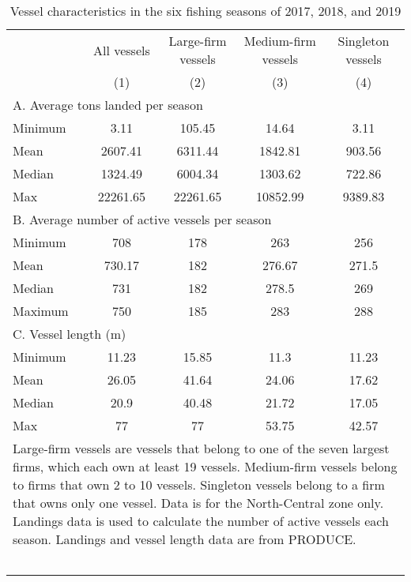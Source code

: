 \begin{table}[tb]
\centering
\caption{Vessel characteristics in the six fishing seasons of 2017, 2018, and 2019} 
\label{vesstats}
\begin{tabular}{lcccc}
   \toprule   & All vessels & Large-firm vessels & Medium-firm vessels & Singleton vessels \\ & (1) & (2) & (3) & (4) \\ 
   \midrule \multicolumn{5}{l}{A. Average tons landed per season} \\ Minimum & 3.11 & 105.45 & 14.64 & 3.11 \\ 
  Mean & 2607.41 & 6311.44 & 1842.81 & 903.56 \\ 
  Median & 1324.49 & 6004.34 & 1303.62 & 722.86 \\ 
  Max & 22261.65 & 22261.65 & 10852.99 & 9389.83 \\ 
   \midrule \multicolumn{5}{l}{B. Average number of active vessels per season} \\ Minimum & 708 & 178 & 263 & 256 \\ 
  Mean & 730.17 & 182 & 276.67 & 271.5 \\ 
  Median & 731 & 182 & 278.5 & 269 \\ 
  Maximum & 750 & 185 & 283 & 288 \\ 
   \midrule \multicolumn{5}{l}{C. Vessel length (m)} \\ Minimum & 11.23 & 15.85 & 11.3 & 11.23 \\ 
  Mean & 26.05 & 41.64 & 24.06 & 17.62 \\ 
  Median & 20.9 & 40.48 & 21.72 & 17.05 \\ 
  Max & 77 & 77 & 53.75 & 42.57 \\ 
   \bottomrule \multicolumn{5}{l}{\multirow{2}{14cm}{Large-firm vessels are vessels that belong to one of the seven largest firms, which each own at least 19 vessels. Medium-firm vessels belong to firms that own 2 to 10 vessels. Singleton vessels belong to a firm that owns only one vessel. Data is for the North-Central zone only. Landings data is used to calculate the number of active vessels each season. Landings and vessel length data are from PRODUCE.}} \\\\\\\\\\\\\\ \end{tabular}
\end{table}
